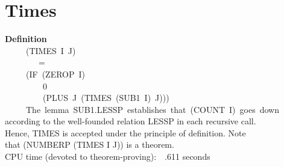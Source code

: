 \documentclass[10pt]{book}
\newenvironment{pubasis}{\begin{flushleft}}{\end{flushleft}}
\newcommand{\axiomordefinition}[1]{\vspace{6pt}\Large\textsf{\textbf{#1}}\normalsize}
\begin{document}
\section{Times}
\begin{pubasis}
\axiomordefinition{Definition}\\
~~~~~(TIMES~I~J)\\
~~~~~~~~=\\
~~~~~(IF~(ZEROP~I)\\
~~~~~~~~~0\\
~~~~~~~~~(PLUS~J~(TIMES~(SUB1~I)~J)))\\

~~~~~The~lemma~SUB1.LESSP~establishes~that~(COUNT~I)~goes~down\\
according to the well-founded relation LESSP in each recursive call.\\
Hence, TIMES is accepted under the principle of definition.  Note\\
that (NUMBERP (TIMES I J)) is a theorem.\\

CPU time (devoted to theorem-proving):~~.611 seconds\\
\end{pubasis}
\end{document}
